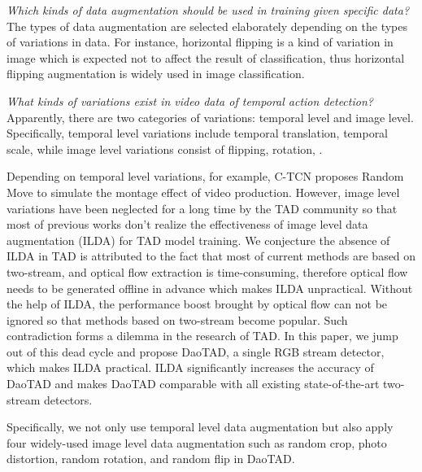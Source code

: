 \documentclass[final]{cvpr}
\begin{document}
\textit{Which kinds of data augmentation should be used  in training given specific data?} The types of data augmentation are selected elaborately depending on the types of variations in data. For instance, horizontal flipping is a kind of variation in image which is expected not to affect the result of classification, thus horizontal flipping augmentation is widely used in image classification. 

\textit{What kinds of variations exist in video data of temporal action detection?} Apparently, there are two categories of variations: temporal level and image level. Specifically, temporal level variations include temporal translation, temporal scale, \etc while image level variations consist of flipping, rotation, \etc.

Depending on temporal level variations, for example, C-TCN \cite{li2020deep} proposes Random Move to simulate the montage effect of video production. However, image level variations have been neglected for a long time by the TAD community so that most of previous works don't realize the effectiveness of image level data augmentation (ILDA) for TAD model training. We conjecture the absence of ILDA in TAD is attributed to the fact that most of current methods are based on two-stream, and optical flow extraction is time-consuming, therefore optical flow needs to be generated offline in advance which makes ILDA unpractical. Without the help of ILDA, the performance boost brought by optical flow can not be ignored so that methods based on two-stream become popular. Such contradiction forms a dilemma in the research of TAD. In this paper, we jump out of this dead cycle and propose DaoTAD, a single RGB stream detector, which makes ILDA practical. ILDA significantly increases the accuracy of DaoTAD and makes DaoTAD comparable with all existing state-of-the-art two-stream detectors.

Specifically, we not only use temporal level data augmentation but also apply four widely-used image level data augmentation such as random crop, photo distortion, random rotation, and random flip in DaoTAD.
\end{document}
